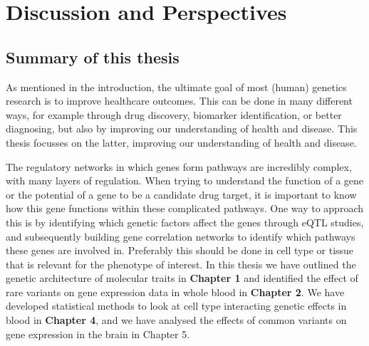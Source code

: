 \chapter{Discussion and Perspectives}
\label{chap:discussion}

{ \Large {} }

\newpage

\section{Summary of this thesis}
As mentioned in the introduction, the ultimate goal of most (human) genetics research is to improve healthcare outcomes. This can be done in many different ways, for example through drug discovery, biomarker identification, or better diagnosing, but also by improving our understanding of health and disease\cite{mcguireRoadAheadGenetics2020, claussnitzerBriefHistoryHuman2020e}. This thesis focusses on the latter, improving our understanding of health and disease. 

The regulatory networks in which genes form pathways are incredibly complex, with many layers of regulation. When trying to understand the function of a gene or the potential of a gene to be a candidate drug target, it is important to know how this gene functions within these complicated pathways. One way to approach this is by identifying which genetic factors affect the genes through eQTL studies, and subsequently building gene correlation networks to identify which pathways these genes are involved in. Preferably this should be done in cell type or tissue that is relevant for the phenotype of interest. In this thesis we have outlined the genetic architecture of molecular traits in \textbf{Chapter 1}\cite{claringbouldGeneticArchitectureMolecular2017} and identified the effect of rare variants on gene expression data in whole blood in \textbf{Chapter 2}\cite{kleinImbalancedExpressionPredicted2020}. We have developed statistical methods to look at cell type interacting genetic effects in blood in \textbf{Chapter 4}\cite{raulaguirre-gamboaDeconvolutionBulkBlood2020}, and we have analysed the effects of common variants on gene expression in the brain in Chapter 5. 

